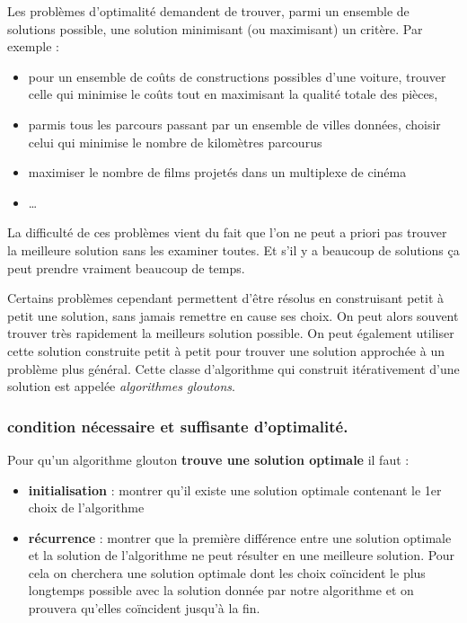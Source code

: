 \documentclass[
]{article}
\providecommand{\tightlist}{%
  \setlength{\itemsep}{0pt}\setlength{\parskip}{0pt}}
\begin{document}
Les problèmes d'optimalité demandent de trouver, parmi un ensemble de
solutions possible, une solution minimisant (ou maximisant) un critère.
Par exemple :

\begin{itemize}
\tightlist
\item
  pour un ensemble de coûts de constructions possibles d'une voiture,
  trouver celle qui minimise le coûts tout en maximisant la qualité
  totale des pièces,
\item
  parmis tous les parcours passant par un ensemble de villes données,
  choisir celui qui minimise le nombre de kilomètres parcourus
\item
  maximiser le nombre de films projetés dans un multiplexe de cinéma
\item
  \ldots{}
\end{itemize}

La difficulté de ces problèmes vient du fait que l'on ne peut a priori
pas trouver la meilleure solution sans les examiner toutes. Et s'il y a
beaucoup de solutions ça peut prendre vraiment beaucoup de temps.

Certains problèmes cependant permettent d'être résolus en construisant
petit à petit une solution, sans jamais remettre en cause ses choix. On
peut alors souvent trouver très rapidement la meilleurs solution
possible. On peut également utiliser cette solution construite petit à
petit pour trouver une solution approchée à un problème plus général.
Cette classe d'algorithme qui construit itérativement d'une solution est
appelée \emph{algorithmes gloutons}.

\hypertarget{condition-nuxe9cessaire-et-suffisante-doptimalituxe9.}{%
\subsubsection{condition nécessaire et suffisante
d'optimalité.}\label{condition-nuxe9cessaire-et-suffisante-doptimalituxe9.}}

Pour qu'un algorithme glouton \textbf{trouve une solution optimale} il
faut :

\begin{itemize}
\tightlist
\item
  \textbf{initialisation} : montrer qu'il existe une solution optimale
  contenant le 1er choix de l'algorithme
\item
  \textbf{récurrence} : montrer que la première différence entre une
  solution optimale et la solution de l'algorithme ne peut résulter en
  une meilleure solution. Pour cela on cherchera une solution optimale
  dont les choix coïncident le plus longtemps possible avec la solution
  donnée par notre algorithme et on prouvera qu'elles coïncident jusqu'à
  la fin.
\end{itemize}
\end{document}
